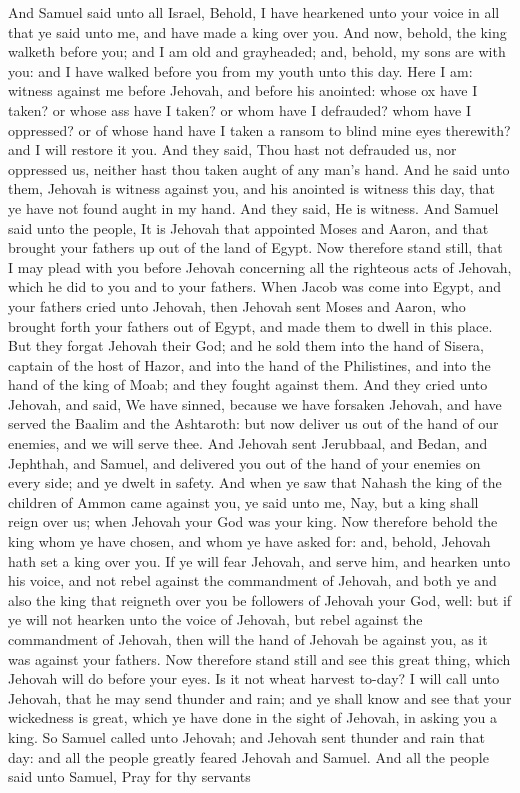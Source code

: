 And Samuel said unto all Israel, Behold, I have hearkened unto your voice in all that ye said unto me, and have made a king over you. And now, behold, the king walketh before you; and I am old and grayheaded; and, behold, my sons are with you: and I have walked before you from my youth unto this day. Here I am: witness against me before Jehovah, and before his anointed: whose ox have I taken? or whose ass have I taken? or whom have I defrauded? whom have I oppressed? or of whose hand have I taken a ransom to blind mine eyes therewith? and I will restore it you. And they said, Thou hast not defrauded us, nor oppressed us, neither hast thou taken aught of any man’s hand. And he said unto them, Jehovah is witness against you, and his anointed is witness this day, that ye have not found aught in my hand. And they said, He is witness.  And Samuel said unto the people, It is Jehovah that appointed Moses and Aaron, and that brought your fathers up out of the land of Egypt. Now therefore stand still, that I may plead with you before Jehovah concerning all the righteous acts of Jehovah, which he did to you and to your fathers. When Jacob was come into Egypt, and your fathers cried unto Jehovah, then Jehovah sent Moses and Aaron, who brought forth your fathers out of Egypt, and made them to dwell in this place. But they forgat Jehovah their God; and he sold them into the hand of Sisera, captain of the host of Hazor, and into the hand of the Philistines, and into the hand of the king of Moab; and they fought against them. And they cried unto Jehovah, and said, We have sinned, because we have forsaken Jehovah, and have served the Baalim and the Ashtaroth: but now deliver us out of the hand of our enemies, and we will serve thee. And Jehovah sent Jerubbaal, and Bedan, and Jephthah, and Samuel, and delivered you out of the hand of your enemies on every side; and ye dwelt in safety. And when ye saw that Nahash the king of the children of Ammon came against you, ye said unto me, Nay, but a king shall reign over us; when Jehovah your God was your king. Now therefore behold the king whom ye have chosen, and whom ye have asked for: and, behold, Jehovah hath set a king over you. If ye will fear Jehovah, and serve him, and hearken unto his voice, and not rebel against the commandment of Jehovah, and both ye and also the king that reigneth over you be followers of Jehovah your God, well: but if ye will not hearken unto the voice of Jehovah, but rebel against the commandment of Jehovah, then will the hand of Jehovah be against you, as it was against your fathers. Now therefore stand still and see this great thing, which Jehovah will do before your eyes. Is it not wheat harvest to-day? I will call unto Jehovah, that he may send thunder and rain; and ye shall know and see that your wickedness is great, which ye have done in the sight of Jehovah, in asking you a king. So Samuel called unto Jehovah; and Jehovah sent thunder and rain that day: and all the people greatly feared Jehovah and Samuel.  And all the people said unto Samuel, Pray for thy servants 